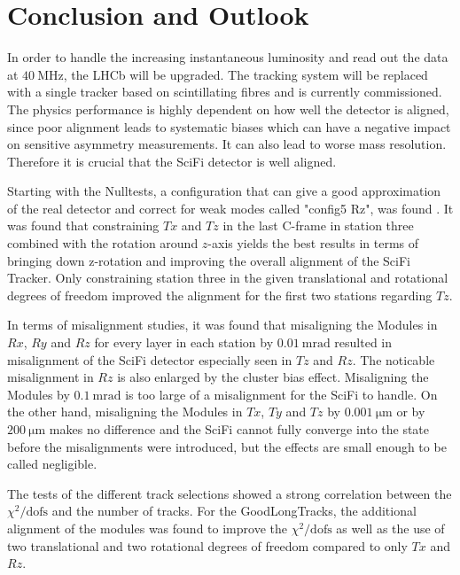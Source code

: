 \chapter{Conclusion and Outlook}

In order to handle the increasing instantaneous luminosity and read out the data at $\SI{40}{\mega\hertz}$, the LHCb will be upgraded.
The tracking system will be replaced with a single tracker based on scintillating fibres and is currently commissioned. The physics performance is
highly dependent on how well the detector is aligned, since poor alignment leads to systematic biases which can have a negative impact on sensitive asymmetry measurements. It can also lead to worse mass resolution. Therefore it is crucial that the SciFi detector is well aligned.

Starting with the Nulltests, a configuration that can give a good approximation of the real detector and correct for weak modes called "config5 Rz", was found . It was found that constraining $Tx$ and $Tz$ in the last C-frame in station three combined with the rotation around $z$-axis yields the best results in terms of bringing down z-rotation and improving the overall alignment of the SciFi Tracker.
Only constraining station three in the given translational and rotational degrees of freedom improved the alignment for the first two stations regarding $Tz$.

In terms of misalignment studies, it was found that misaligning the Modules in $Rx$, $Ry$ and $Rz$ for every layer in each station by $\SI{0.01}{\milli\radian}$ resulted in misalignment of the SciFi detector especially seen in $Tz$ and $Rz$. The noticable misalignment in $Rz$ is also enlarged by the cluster bias effect.
Misaligning the Modules by $\SI{0.1}{\milli\radian}$ is too large of a misalignment for the SciFi to handle.
On the other hand, misaligning the Modules in $Tx$, $Ty$ and $Tz$ by $\SI{0.001}{\micro\metre}$ or by $\SI{200}{\micro\metre}$ makes no difference and the SciFi cannot fully converge into the state before the misalignments were introduced, but the effects are small enough to be called negligible.

The tests of the different track selections showed a strong correlation between the $\chi^2 / \text{dofs}$ and the number of tracks.
For the GoodLongTracks, the additional alignment of the modules was found to improve the $\chi^2 / \text{dofs}$ as well as the use of two translational and two rotational degrees of freedom compared to only $Tx$ and $Rz$.

